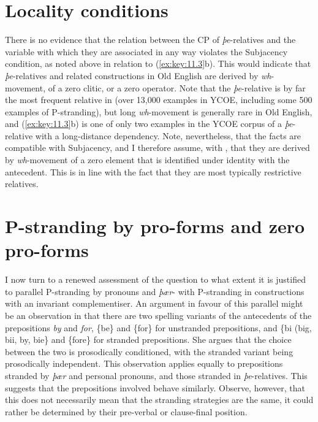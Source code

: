 \documentclass[output=paper]{langsci/langscibook}
\begin{document}
\section{Locality conditions}

There is no evidence that the relation between the CP of \textit{þe}-relatives
and the variable with which they are associated in any way violates the
Subjacency condition, as noted above in relation to (\ref{ex:key:11.3}b). This
would indicate that \textit{þe}-relatives and related constructions in Old
English are derived by \textit{wh}-movement, of a zero
clitic, or a zero operator. Note that the \textit{þe}-relative is
by far the most frequent relative in  (over 13,000 examples in
YCOE, including some 500 examples of P-stranding),  but long
\textit{wh}-movement is generally rare in Old English, and (\ref{ex:key:11.3}b)
is one of only two examples in the YCOE corpus of a \textit{þe}-relative with a
long-distance dependency. Note, nevertheless, that the facts are compatible
with Subjacency, and I therefore assume, with \citet{vanKemenade1987}, that
they are derived by \textit{wh}-movement of a zero element
that is identified under identity with the antecedent. This is in line with the
fact that they are most typically restrictive relatives.

\section{P-stranding by pro-forms and zero pro-forms}

I now turn to a renewed assessment of the question to what extent it is
justified to parallel P-stranding by pronouns and \textit{þær}- with
P-stranding  in constructions with an invariant complementiser. An argument in
favour of this parallel might be an observation in \citet{Alcorn2014} that
there are two spelling variants of the  antecedents of the
prepositions \textit{by} and \textit{for}, \{be\} and \{for\} for unstranded
prepositions, and \{bi (big, bii, by, bie\} and \{fore\} for stranded
prepositions.  She argues that the choice between the two is prosodically
conditioned, with the stranded variant being prosodically independent. This
observation applies equally to prepositions stranded by \textit{þær} and
personal pronouns, and those stranded in \textit{þe}-relatives. This suggests
that the prepositions involved behave similarly. Observe, however, that this
does not necessarily mean that the stranding strategies are the same, it could
rather be determined by their pre-verbal or clause-final position.
\end{document}
